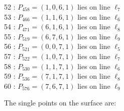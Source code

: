 \documentclass{article}
\begin{document}
{\begin{multicols}{2}
52 : $P_{458}=( 1, 0, 6, 1 )$ lies on line $\ell_{7}$\\
53 : $P_{466}=( 1, 1, 6, 1 )$ lies on line $\ell_{6}$\\
54 : $P_{471}=( 6, 1, 6, 1 )$ lies on line $\ell_{8}$\\
55 : $P_{519}=( 6, 7, 6, 1 )$ lies on line $\ell_{9}$\\
56 : $P_{521}=( 0, 0, 7, 1 )$ lies on line $\ell_{5}$\\
57 : $P_{522}=( 1, 0, 7, 1 )$ lies on line $\ell_{7}$\\
58 : $P_{530}=( 1, 1, 7, 1 )$ lies on line $\ell_{6}$\\
59 : $P_{536}=( 7, 1, 7, 1 )$ lies on line $\ell_{8}$\\
60 : $P_{576}=( 7, 6, 7, 1 )$ lies on line $\ell_{9}$\\
\end{multicols}
The single points on the surface are:\\
}
\end{document}
